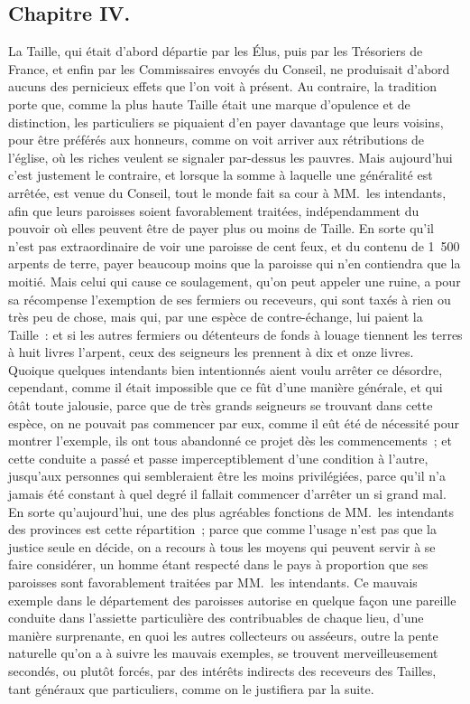 \documentclass[french,twoside]{book} %
\begin{document}
\subsection[{Chapitre IV.}]{Chapitre IV.}
\noindent La Taille, qui était d’abord départie par les Élus, puis par les Trésoriers de France, et enfin par les Commissaires envoyés du Conseil, ne produisait d’abord aucuns des pernicieux effets que l’on voit à présent. Au contraire, la tradition porte que, comme la plus haute Taille était une marque d’opulence et de distinction, les particuliers se piquaient d’en payer davantage que leurs voisins, pour être préférés aux honneurs, comme on voit arriver aux rétributions de l’église, où les riches veulent se signaler par-dessus les pauvres. Mais aujourd’hui c’est justement le contraire, et lorsque la somme à laquelle une généralité est arrêtée, est venue du Conseil, tout le monde fait sa cour à MM. les intendants, afin que leurs paroisses soient favorablement traitées, indépendamment du pouvoir où elles peuvent être de payer plus ou moins de Taille. En sorte qu’il n’est pas extraordinaire de voir une paroisse de cent feux, et du contenu de 1 500 arpents de terre, payer beaucoup moins que la paroisse qui n’en contiendra que la moitié. Mais celui qui cause ce soulagement, qu’on peut appeler une ruine, a pour sa récompense l’exemption de ses fermiers ou receveurs, qui sont taxés à rien ou très peu de chose, mais qui, par une espèce de contre-échange, lui paient la Taille : et si les autres fermiers ou détenteurs de fonds à louage tiennent les terres à huit livres l’arpent, ceux des seigneurs les prennent à dix et onze livres. Quoique quelques intendants bien intentionnés aient voulu arrêter ce désordre, cependant, comme il était impossible que ce fût d’une manière générale, et qui ôtât toute jalousie, parce que de très grands seigneurs se trouvant dans cette espèce, on ne pouvait pas commencer par eux, comme il eût été de nécessité pour montrer l’exemple, ils ont tous abandonné ce projet dès les commencements ; et cette conduite a passé et passe imperceptiblement d’une condition à l’autre, jusqu’aux personnes qui sembleraient être les moins privilégiées, parce qu’il n’a jamais été constant à quel degré il fallait commencer d’arrêter un si grand mal. En sorte qu’aujourd’hui, une des plus agréables fonctions de MM. les intendants des provinces est cette répartition ; parce que comme l’usage n’est pas que la justice seule en décide, on a recours à tous les moyens qui peuvent servir à se faire considérer, un homme étant respecté dans le pays à proportion que ses paroisses sont favorablement traitées par MM. les intendants. Ce mauvais exemple dans le département des paroisses autorise en quelque façon une pareille conduite dans l’assiette particulière des contribuables de chaque lieu, d’une manière surprenante, en quoi les autres collecteurs ou asséeurs, outre la pente naturelle qu’on a à suivre les mauvais exemples, se trouvent merveilleusement secondés, ou plutôt forcés, par des intérêts indirects des receveurs des Tailles, tant généraux que particuliers, comme on le justifiera par la suite.
\end{document}
